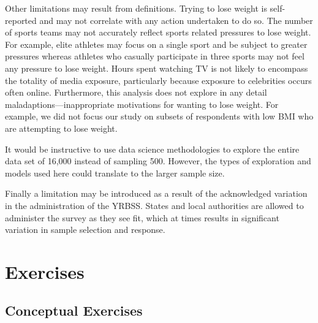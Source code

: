 \documentclass[
]{krantz}
\begin{document}
Other limitations may result from definitions. Trying to lose weight is self-reported and may not correlate with any action undertaken to do so. The number of sports teams may not accurately reflect sports related pressures to lose weight. For example, elite athletes may focus on a single sport and be subject to greater pressures whereas athletes who casually participate in three sports may not feel any pressure to lose weight. Hours spent watching TV is not likely to encompass the totality of media exposure, particularly because exposure to celebrities occurs often online. Furthermore, this analysis does not explore in any detail maladaptions---inappropriate motivations for wanting to lose weight. For example, we did not focus our study on subsets of respondents with low BMI who are attempting to lose weight.

It would be instructive to use data science methodologies to explore the entire data set of 16,000 instead of sampling 500. However, the types of exploration and models used here could translate to the larger sample size.

Finally a limitation may be introduced as a result of the acknowledged variation in the administration of the YRBSS. States and local authorities are allowed to administer the survey as they see fit, which at times results in significant variation in sample selection and response.

\hypertarget{exercises-5}{%
\section{Exercises}\label{exercises-5}}

\hypertarget{conceptual-exercises-3}{%
\subsection{Conceptual Exercises}\label{conceptual-exercises-3}}
\end{document}
